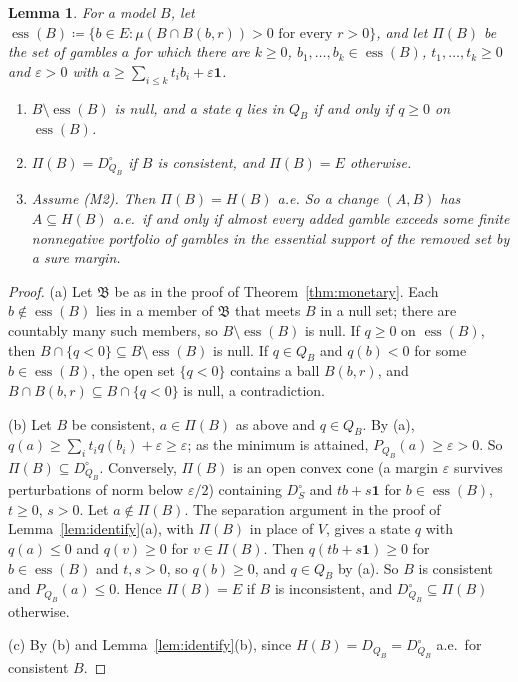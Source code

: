 \documentclass[11pt]{article}
\newtheorem{lemma}[theorem]{Lemma}
\theoremstyle{definition}
\newcommand{\one}{\mathbf 1}
\DeclareMathOperator{\ess}{ess}
\begin{document}
\begin{lemma}\label{lem:portfolio}
For a model $B$, let $\ess(B)\coloneqq\{b\in E:\mu(B\cap B(b,r))>0\text{ for every }r>0\}$, and let $\Pi(B)$ be the set of gambles $a$ for which there are $k\ge0$, $b_1,\dots,b_k\in\ess(B)$, $t_1,\dots,t_k\ge0$ and $\varepsilon>0$ with $a\ge\sum_{i\le k}t_ib_i+\varepsilon\one$.
\begin{enumerate}[label=(\alph*)]
\item $B\setminus\ess(B)$ is null, and a state $q$ lies in $Q_B$ if and only if $q\ge0$ on $\ess(B)$.
\item $\Pi(B)=D^\circ_{Q_B}$ if $B$ is consistent, and $\Pi(B)=E$ otherwise.
\item Assume (M2). Then $\Pi(B)=H(B)$ a.e. So a change $(A,B)$ has $A\subseteq H(B)$ a.e.\ if and only if almost every added gamble exceeds some finite nonnegative portfolio of gambles in the essential support of the removed set by a sure margin.
\end{enumerate}
\end{lemma}
\begin{proof}
(a) Let $\mathfrak B$ be as in the proof of Theorem~\ref{thm:monetary}. Each $b\notin\ess(B)$ lies in a member of $\mathfrak B$ that meets $B$ in a null set; there are countably many such members, so $B\setminus\ess(B)$ is null. If $q\ge0$ on $\ess(B)$, then $B\cap\{q<0\}\subseteq B\setminus\ess(B)$ is null. If $q\in Q_B$ and $q(b)<0$ for some $b\in\ess(B)$, the open set $\{q<0\}$ contains a ball $B(b,r)$, and $B\cap B(b,r)\subseteq B\cap\{q<0\}$ is null, a contradiction.

(b) Let $B$ be consistent, $a\in\Pi(B)$ as above and $q\in Q_B$. By (a), $q(a)\ge\sum_it_iq(b_i)+\varepsilon\ge\varepsilon$; as the minimum is attained, $P_{Q_B}(a)\ge\varepsilon>0$. So $\Pi(B)\subseteq D^\circ_{Q_B}$. Conversely, $\Pi(B)$ is an open convex cone (a margin $\varepsilon$ survives perturbations of norm below $\varepsilon/2$) containing $D^\circ_S$ and $tb+s\one$ for $b\in\ess(B)$, $t\ge0$, $s>0$. Let $a\notin\Pi(B)$. The separation argument in the proof of Lemma~\ref{lem:identify}(a), with $\Pi(B)$ in place of $V$, gives a state $q$ with $q(a)\le0$ and $q(v)\ge0$ for $v\in\Pi(B)$. Then $q(tb+s\one)\ge0$ for $b\in\ess(B)$ and $t,s>0$, so $q(b)\ge0$, and $q\in Q_B$ by (a). So $B$ is consistent and $P_{Q_B}(a)\le0$. Hence $\Pi(B)=E$ if $B$ is inconsistent, and $D^\circ_{Q_B}\subseteq\Pi(B)$ otherwise.

(c) By (b) and Lemma~\ref{lem:identify}(b), since $H(B)=D_{Q_B}=D^\circ_{Q_B}$ a.e.\ for consistent $B$.
\end{proof}
\end{document}
